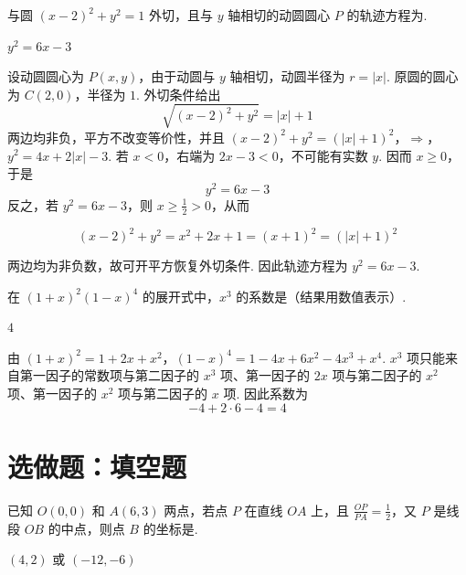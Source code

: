 \documentclass[UTF8,a4paper,oneside,11pt]{ctexbook}
\begin{document}
\begin{problem}
与圆 \((x-2)^2+y^2=1\) 外切，且与 \(y\) 轴相切的动圆圆心 \(P\) 的轨迹方程为\fillinblank{}.
\end{problem}

\begin{answer}
\(y^2=6x-3\)
\end{answer}

\begin{solution}
设动圆圆心为 \(P(x,y)\)，由于动圆与 \(y\) 轴相切，动圆半径为 \(r=|x|\). 原圆的圆心为 \(C(2,0)\)，半径为 \(1\). 外切条件给出
\[
\sqrt{(x-2)^2+y^2}=|x|+1
\]
两边均非负，平方不改变等价性，并且
\((x-2)^2+y^2=(|x|+1)^2\)，\(\Longrightarrow\)，\(y^2=4x+2|x|-3\).
若 \(x<0\)，右端为 \(2x-3<0\)，不可能有实数 \(y\). 因而 \(x\geq0\)，于是
\[
y^2=6x-3
\]
反之，若 \(y^2=6x-3\)，则 \(x\geq\frac{1}{2}>0\)，从而

\[
(x-2)^2+y^2=x^2+2x+1=(x+1)^2=(|x|+1)^2
\]

两边均为非负数，故可开平方恢复外切条件. 因此轨迹方程为 \(y^2=6x-3\).
\end{solution}

\begin{problem}
在 \(\left(1+x\right)^2\left(1-x\right)^4\) 的展开式中，\(x^3\) 的系数是（结果用数值表示）\fillinblank{}.
\end{problem}

\begin{answer}
\(4\)
\end{answer}

\begin{solution}
由
\((1+x)^2=1+2x+x^2\)，\((1-x)^4=1-4x+6x^2-4x^3+x^4\).
\(x^3\) 项只能来自第一因子的常数项与第二因子的 \(x^3\) 项、第一因子的 \(2x\) 项与第二因子的 \(x^2\) 项、第一因子的 \(x^2\) 项与第二因子的 \(x\) 项. 因此系数为
\[
-4+2\cdot6-4=4
\]
\end{solution}

\section{选做题：填空题}

\begin{problem}[A]
已知 \(O(0,0)\) 和 \(A(6,3)\) 两点，若点 \(P\) 在直线 \(OA\) 上，且 \(\frac{OP}{PA}=\frac{1}{2}\)，又 \(P\) 是线段 \(OB\) 的中点，则点 \(B\) 的坐标是\fillinblank{}.
\end{problem}

\begin{answer}
\((4,2)\) 或 \((-12,-6)\)
\end{answer}
\end{document}
